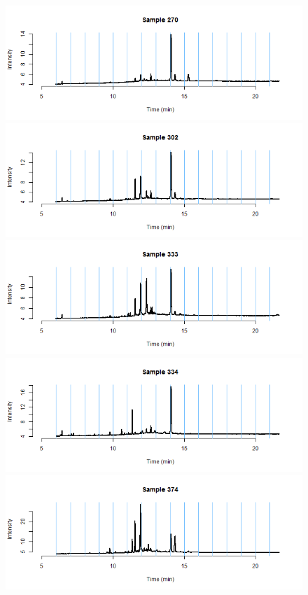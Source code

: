 \documentclass[11pt]{article}
\theoremstyle{plain}
\theoremstyle{definition}
\begin{document}
\begin{figure}[H]
\begin{center}
\includegraphics[trim ={3.5cm 2.7cm 2cm 2cm},scale=.6, clip=true]{BinPlotDMC_17.png}
\includegraphics[trim ={3.5cm 2.7cm 2cm 2cm},scale=.6, clip=true]{BinPlotDMC_18.png}
\includegraphics[trim ={3.5cm 2.7cm 2cm 2cm},scale=.6, clip=true]{BinPlotDMC_19.png}
\includegraphics[trim ={3.5cm 2.7cm 2cm 2cm},scale=.6, clip=true]{BinPlotDMC_20.png}
\includegraphics[trim ={3.5cm 2.7cm 2cm 2cm},scale=.6, clip=true]{BinPlotDMC_21.png}

\end{center}
\end{figure}
\end{document}

